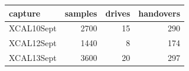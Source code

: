 \begin{tabular}{lrrr}
\toprule
capture & samples & drives & handovers \\
\midrule
XCAL10Sept & 2700 & 15 & 290 \\
XCAL12Sept & 1440 & 8 & 174 \\
XCAL13Sept & 3600 & 20 & 297 \\
\bottomrule
\end{tabular}
